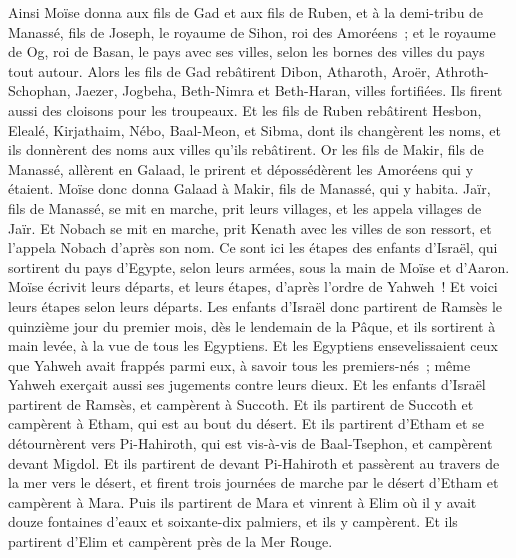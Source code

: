 \begin{multicols}{2}
Ainsi Moïse donna aux fils de Gad et aux fils de Ruben, et à la demi-tribu de Manassé, fils de Joseph, le royaume de Sihon, roi des Amoréens~; et le royaume de Og, roi de Basan, le pays avec ses villes, selon les bornes des villes du pays tout autour.
Alors les fils de Gad rebâtirent Dibon, Atharoth, Aroër,
Athroth-Schophan, Jaezer, Jogbeha,
Beth-Nimra et Beth-Haran, villes fortifiées. Ils firent aussi des cloisons pour les troupeaux.
Et les fils de Ruben rebâtirent Hesbon, Elealé, Kirjathaim,
Nébo, Baal-Meon, et Sibma, dont ils changèrent les noms, et ils donnèrent des noms aux villes qu'ils rebâtirent.
Or les fils de Makir, fils de Manassé, allèrent en Galaad, le prirent et dépossédèrent les Amoréens qui y étaient.
Moïse donc donna Galaad à Makir, fils de Manassé, qui y habita.
Jaïr, fils de Manassé, se mit en marche, prit leurs villages, et les appela villages de Jaïr.
Et Nobach se mit en marche, prit Kenath avec les villes de son ressort, et l'appela Nobach d'après son nom.
\VerseOne{}Ce sont ici les étapes des enfants d'Israël, qui sortirent du pays d'Egypte, selon leurs armées, sous la main de Moïse et d'Aaron.
Moïse écrivit leurs départs, et leurs étapes, d'après l'ordre de Yahweh~! Et voici leurs étapes selon leurs départs.
Les enfants d'Israël donc partirent de Ramsès le quinzième jour du premier mois, dès le lendemain de la Pâque, et ils sortirent à main levée, à la vue de tous les Egyptiens.
Et les Egyptiens ensevelissaient ceux que Yahweh avait frappés parmi eux, à savoir tous les premiers-nés~; même Yahweh exerçait aussi ses jugements contre leurs dieux.
Et les enfants d'Israël partirent de Ramsès, et campèrent à Succoth.
Et ils partirent de Succoth et campèrent à Etham, qui est au bout du désert.
Et ils partirent d'Etham et se détournèrent vers Pi-Hahiroth, qui est vis-à-vis de Baal-Tsephon, et campèrent devant Migdol.
Et ils partirent de devant Pi-Hahiroth et passèrent au travers de la mer vers le désert, et firent trois journées de marche par le désert d'Etham et campèrent à Mara.
Puis ils partirent de Mara et vinrent à Elim où il y avait douze fontaines d'eaux et soixante-dix palmiers, et ils y campèrent.
Et ils partirent d'Elim et campèrent près de la Mer Rouge.

\end{multicols}
